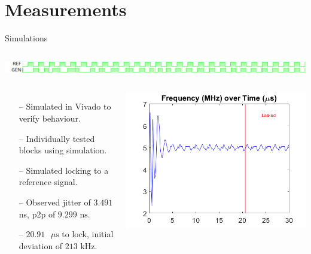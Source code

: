 \documentclass{beamer}
\begin{document}
\section*{Measurements}
\begin{frame}{Simulations}
	\begin{columns}
		\vspace*{-10mm}
		\hspace{10mm}
		\begin{flushleft}
 		\includegraphics[scale=0.4]{../vivado_sim}
 	\end{flushleft}
 \end{columns}
	\begin{columns}
    \begin{itemize}
	    \item[--]
	        Simulated in Vivado to verify behaviour.
	    \item[--]
	        Individually tested blocks using simulation.
	    \item[--]
	        Simulated locking to a reference signal.
	    \item[--]
            Observed jitter of $3.491$ ns, p2p of $9.299\textrm{ ns}$.
	    \item[--]
            $20.91\textrm{ }\mu\textrm{s}$ to lock, initial deviation of $213\textrm{ kHz}$.
	\end{itemize}
	
    \begin{flushleft}
    	\includegraphics[scale=0.45]{../sim_locking}
    \end{flushleft}
	
	\end{columns}

\end{frame}
\end{document}
